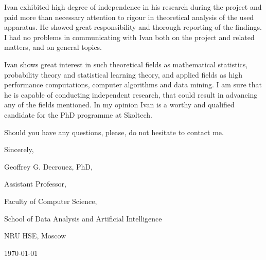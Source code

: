 \documentclass[14pt]{extarticle}
\begin{document}
Ivan exhibited high degree of independence in his research during the project and
paid more than necessary attention to rigour in theoretical analysis of the used
apparatus. He showed great responsibility and thorough reporting of the findings.
I had no problems in communicating with Ivan both on the project and related matters,
and on general topics. \par\medskip

Ivan shows great interest in such theoretical fields as mathematical statistics,
probability theory and statistical learning theory, and applied fields as high performance
computations, computer algorithms and data mining. I am sure that he is capable of
conducting independent research, that could result in advancing any of the fields
mentioned. In my opinion Ivan is a worthy and qualified candidate for the PhD programme
at Skoltech. \par\medskip

Should you have any questions, please, do not hesitate to contact me. \par\bigskip

Sincerely, \par \medskip

Geoffrey G. Decrouez, PhD, \par
Assistant Professor, \par
Faculty of Computer Science, \par
School of Data Analysis and Artificial Intelligence \par
NRU HSE, Moscow \par
\hfill\today
\end{document}
